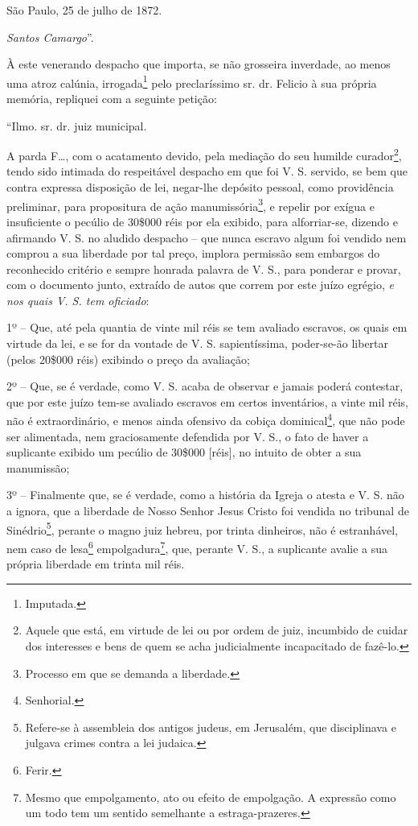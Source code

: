 São Paulo, 25 de julho de 1872.

\emph{Santos Camargo}''.

À este venerando despacho que importa, se não grosseira inverdade, ao
menos uma atroz calúnia, irrogada\footnote{ Imputada.} pelo
preclaríssimo sr. dr. Felicio à sua própria memória, repliquei com a
seguinte petição:

``Ilmo. sr. dr. juiz municipal.

A parda F\ldots{}, com o acatamento devido, pela mediação do seu humilde
curador\footnote{ Aquele que está, em virtude de lei ou por ordem de
  juiz, incumbido de cuidar dos interesses e bens de quem se acha
  judicialmente incapacitado de fazê-lo.}, tendo sido intimada do
respeitável despacho em que foi V. S. servido, se bem que contra
expressa disposição de lei, negar-lhe depósito pessoal, como providência
preliminar, para propositura de ação manumissória\footnote{ Processo em
  que se demanda a liberdade.}, e repelir por exígua e insuficiente o
pecúlio de 30\$000 réis por ela exibido, para alforriar-se, dizendo e
afirmando V. S. no aludido despacho -- que nunca escravo algum foi
vendido nem comprou a sua liberdade por tal preço, implora permissão sem
embargos do reconhecido critério e sempre honrada palavra de V. S., para
ponderar e provar, com o documento junto, extraído de autos que correm
por este juízo egrégio, \emph{e nos quais V. S. tem oficiado}:

1º -- Que, até pela quantia de vinte mil réis se tem avaliado escravos,
os quais em virtude da lei, e se for da vontade de V. S. sapientíssima,
poder-se-ão libertar (pelos 20\$000 réis) exibindo o preço da avaliação;

2º -- Que, se é verdade, como V. S. acaba de observar e jamais poderá
contestar, que por este juízo tem-se avaliado escravos em certos
inventários, a vinte mil réis, não é extraordinário, e menos ainda
ofensivo da cobiça dominical\footnote{ Senhorial.}, que não pode ser
alimentada, nem graciosamente defendida por V. S., o fato de haver a
suplicante exibido um pecúlio de 30\$000 {[}réis{]}, no intuito de obter
a sua manumissão;

3º -- Finalmente que, se é verdade, como a história da Igreja o atesta e
V. S. não a ignora, que a liberdade de Nosso Senhor Jesus Cristo foi
vendida no tribunal de Sinédrio\footnote{ Refere-se à assembleia dos
  antigos judeus, em Jerusalém, que disciplinava e julgava crimes contra
  a lei judaica.}, perante o magno juiz hebreu, por trinta dinheiros,
não é estranhável, nem caso de lesa\footnote{ Ferir.}
empolgadura\footnote{ Mesmo que empolgamento, ato ou efeito de
  empolgação. A expressão como um todo tem um sentido semelhante a
  estraga-prazeres.}, que, perante V. S., a suplicante avalie a sua
própria liberdade em trinta mil réis.

